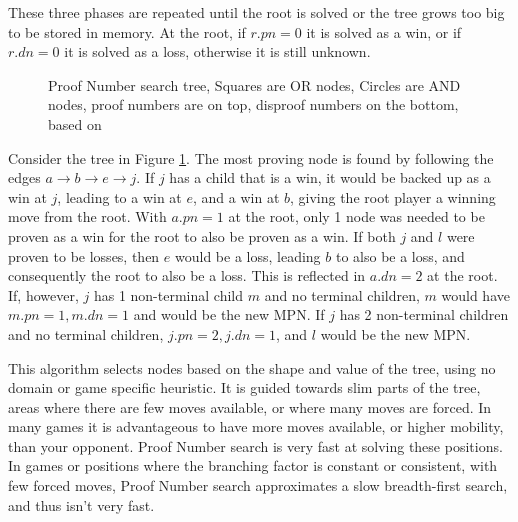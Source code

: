 These three phases are repeated until the root is solved or the tree grows too big to be stored in memory. At the root, if $r.pn = 0$ it is solved as a win, or if $r.dn = 0$ it is solved as a loss, otherwise it is still unknown.

\begin{figure}
\centering
{}
\caption{Proof Number search tree, Squares are OR nodes, Circles are AND nodes, proof numbers are on top, disproof numbers on the bottom, based on \cite{winands2003-PDS-PN}}
\label{fig:pntree}
\end{figure}

Consider the tree in Figure \ref{fig:pntree}. The most proving node is found by following the edges $a \rightarrow b \rightarrow e \rightarrow j$. If $j$ has a child that is a win, it would be backed up as a win at $j$, leading to a win at $e$, and a win at $b$, giving the root player a winning move from the root. With $a.pn = 1$ at the root, only 1 node was needed to be proven as a win for the root to also be proven as a win. If both $j$ and $l$ were proven to be losses, then $e$ would be a loss, leading $b$ to also be a loss, and consequently the root to also be a loss. This is reflected in $a.dn = 2$ at the root. If, however, $j$ has 1 non-terminal child $m$ and no terminal children, $m$ would have $m.pn = 1, m.dn = 1$ and would be the new MPN. If $j$ has 2 non-terminal children and no terminal children, $j.pn = 2, j.dn = 1$, and $l$ would be the new MPN.

This algorithm selects nodes based on the shape and value of the tree, using no domain or game specific heuristic. It is guided towards slim parts of the tree, areas where there are few moves available, or where many moves are forced. In many games it is advantageous to have more moves available, or higher mobility, than your opponent. Proof Number search is very fast at solving these positions. In games or positions where the branching factor is constant or consistent, with few forced moves, Proof Number search approximates a slow breadth-first search, and thus isn't very fast.

